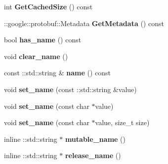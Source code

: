 \begin{DoxyCompactItemize}
int {\bfseries Get\+Cached\+Size} () const
\item 
\mbox{\label{classcaffe_1_1_layer_parameter_a092bcb6629cf7a9c40fe8c122c713f7e}} 
\+::google\+::protobuf\+::\+Metadata {\bfseries Get\+Metadata} () const
\item 
\mbox{\label{classcaffe_1_1_layer_parameter_acc096ec98534e1078e7c6a10ef1ee3ed}} 
bool {\bfseries has\+\_\+name} () const
\item 
\mbox{\label{classcaffe_1_1_layer_parameter_adac91719a7b8564db3251484e7b2555b}} 
void {\bfseries clear\+\_\+name} ()
\item 
\mbox{\label{classcaffe_1_1_layer_parameter_a33bea21787ab8031513f0437e69f2003}} 
const \+::std\+::string \& {\bfseries name} () const
\item 
\mbox{\label{classcaffe_1_1_layer_parameter_a0e0772ecd8e1b154709528d14f12c0f8}} 
void {\bfseries set\+\_\+name} (const \+::std\+::string \&value)
\item 
\mbox{\label{classcaffe_1_1_layer_parameter_acfa7de613e05be903c94e7807ed52d12}} 
void {\bfseries set\+\_\+name} (const char $\ast$value)
\item 
\mbox{\label{classcaffe_1_1_layer_parameter_aae3762f2a629542b74c8d4520712b67b}} 
void {\bfseries set\+\_\+name} (const char $\ast$value, size\+\_\+t size)
\item 
\mbox{\label{classcaffe_1_1_layer_parameter_a6f9b1a9e0caec97b7b499899e0ec387f}} 
inline \+::std\+::string $\ast$ {\bfseries mutable\+\_\+name} ()
\item 
\mbox{\label{classcaffe_1_1_layer_parameter_a1ed146d9c1a0f5e5a08b286c0927d75c}} 
inline \+::std\+::string $\ast$ {\bfseries release\+\_\+name} ()
\item 
\mbox{\label{classcaffe_1_1_layer_parameter_a5a708b45c82367c84803b7d04077faa9}} 

\end{DoxyCompactItemize}
